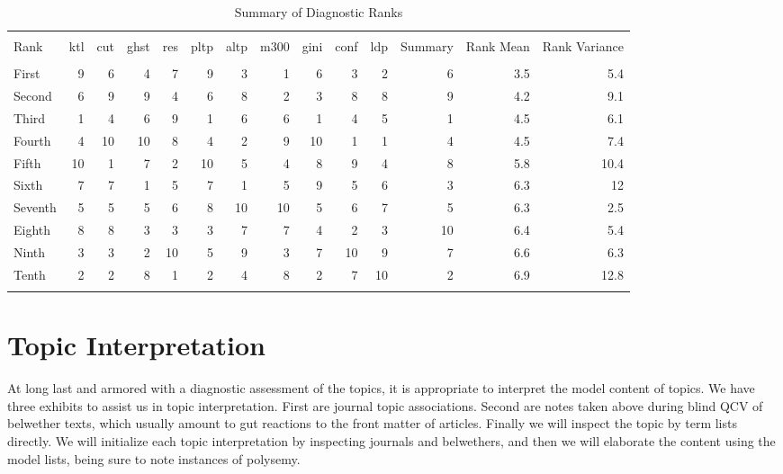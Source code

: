 \documentclass[]{book}
\theoremstyle{definition}
\theoremstyle{definition}
\theoremstyle{definition}
\theoremstyle{remark}
\begin{document}
\begin{table}[!htbp] \centering 
  \caption{Summary of Diagnostic Ranks} 
  \label{tab:sumrnk} 
\begin{tabular}{@{\extracolsep{5pt}} lrrrrrrrrrrrrr} 
\\[-1.8ex]\hline 
\hline \\[-1.8ex] 
Rank & ktl & cut & ghst & res & pltp & altp & m300 & gini & conf & ldp & Summary & Rank Mean & Rank Variance \\ 
\hline \\[-1.8ex] 
First & 9 & 6 & 4 & 7 & 9 & 3 & 1 & 6 & 3 & 2 & 6 & 3.5 & 5.4 \\ 
Second & 6 & 9 & 9 & 4 & 6 & 8 & 2 & 3 & 8 & 8 & 9 & 4.2 & 9.1 \\ 
Third & 1 & 4 & 6 & 9 & 1 & 6 & 6 & 1 & 4 & 5 & 1 & 4.5 & 6.1 \\ 
Fourth & 4 & 10 & 10 & 8 & 4 & 2 & 9 & 10 & 1 & 1 & 4 & 4.5 & 7.4 \\ 
Fifth & 10 & 1 & 7 & 2 & 10 & 5 & 4 & 8 & 9 & 4 & 8 & 5.8 & 10.4 \\ 
Sixth & 7 & 7 & 1 & 5 & 7 & 1 & 5 & 9 & 5 & 6 & 3 & 6.3 & 12 \\ 
Seventh & 5 & 5 & 5 & 6 & 8 & 10 & 10 & 5 & 6 & 7 & 5 & 6.3 & 2.5 \\ 
Eighth & 8 & 8 & 3 & 3 & 3 & 7 & 7 & 4 & 2 & 3 & 10 & 6.4 & 5.4 \\ 
Ninth & 3 & 3 & 2 & 10 & 5 & 9 & 3 & 7 & 10 & 9 & 7 & 6.6 & 6.3 \\ 
Tenth & 2 & 2 & 8 & 1 & 2 & 4 & 8 & 2 & 7 & 10 & 2 & 6.9 & 12.8 \\ 
\hline \\[-1.8ex] 
\end{tabular} 
\end{table}

\hypertarget{topic-interpretation}{%
\section{Topic Interpretation}\label{topic-interpretation}}

At long last and armored with a diagnostic assessment of the topics, it
is appropriate to interpret the model content of topics. We have three
exhibits to assist us in topic interpretation. First are journal topic
associations. Second are notes taken above during blind QCV of belwether
texts, which usually amount to gut reactions to the front matter of
articles. Finally we will inspect the topic by term lists directly. We
will initialize each topic interpretation by inspecting journals and
belwethers, and then we will elaborate the content using the model
lists, being sure to note instances of polysemy.
\end{document}
